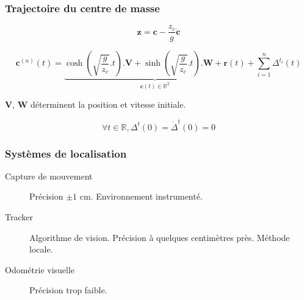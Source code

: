 \documentclass[14pt,utf8x,hyperref={pdfpagelabels=false}]{beamer}
\begin{document}
\begin{slideAction}
  \frametitle{Trajectoire du centre de masse}

  \begin{equation*}
    \mathbf{z} = \mathbf{c} - \frac{z_c}{g} \ddot{\mathbf{c}}
  \end{equation*}

  \begin{equation*}
    \mathbf{c}^{(n)}(t) =
    \underbrace{\scriptstyle \cosh(\sqrt{\frac{g}{z_c}}.t) . \mathbf{V} +
      \sinh(\sqrt{\frac{g}{z_c}}.t) . \mathbf{W} +
      \mathbf{r}(t)}_{\mathbf{c}(t) \in \mathbb{R}^2} + \sum_{i=1}^n \Delta^{t_i}(t)
  \end{equation*}

  \begin{center}
    $\mathbf{V}$, $\mathbf{W}$ déterminent la position et vitesse
    initiale.
  \end{center}

  \begin{equation*}
    \forall t \in \mathbb{R}, \Delta^t(0) = \dot{\Delta}^t(0) = 0
  \end{equation*}
\end{slideAction}




\begin{slidePerception}
  \frametitle{Systèmes de localisation}

  \begin{changeleftmargin}{1.1cm}
  \begin{description}
  \item[Capture de mouvement] Précision $\pm 1$ cm. Environnement
    instrumenté.
  \item[Tracker] Algorithme de vision. Précision à quelques
    centimètres près. Méthode locale.
  \item[Odométrie visuelle] Précision trop faible.
  \end{description}
  \end{changeleftmargin}
\end{slidePerception}

\end{document}
